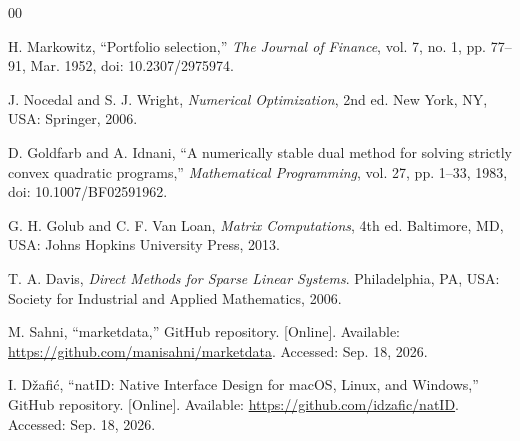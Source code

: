 \documentclass[conference]{IEEEtran}
\begin{document}
\balance
\begin{thebibliography}{00}

H. Markowitz, ``Portfolio selection,'' \emph{The Journal of Finance},
vol. 7, no. 1, pp. 77--91, Mar. 1952, doi: 10.2307/2975974.

J. Nocedal and S. J. Wright, \emph{Numerical Optimization}, 2nd ed.
New York, NY, USA: Springer, 2006.

D. Goldfarb and A. Idnani, ``A numerically stable dual method for solving
strictly convex quadratic programs,'' \emph{Mathematical Programming},
vol. 27, pp. 1--33, 1983, doi: 10.1007/BF02591962.

G. H. Golub and C. F. Van Loan, \emph{Matrix Computations}, 4th ed.
Baltimore, MD, USA: Johns Hopkins University Press, 2013.

T. A. Davis, \emph{Direct Methods for Sparse Linear Systems}.
Philadelphia, PA, USA: Society for Industrial and Applied Mathematics, 2006.

M. Sahni, ``marketdata,'' GitHub repository. [Online]. Available:
\url{https://github.com/manisahni/marketdata}. Accessed: Sep. 18, 2026.

I. D\v{z}afi\'{c}, ``natID: Native Interface Design for macOS, Linux, and
Windows,'' GitHub repository. [Online]. Available:
\url{https://github.com/idzafic/natID}. Accessed: Sep. 18, 2026.

\end{thebibliography}
\end{document}
